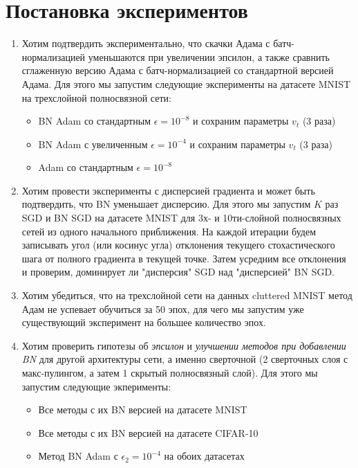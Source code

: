 \documentclass[12pt,oneside]{article}
\begin{document}
\section{Постановка экспериментов}

\begin{enumerate}
\item Хотим подтвердить экспериментально, что скачки Адама с батч-нормализацией уменьшаются при увеличении эпсилон, а также сравнить сглаженную версию Адама с батч-нормализацией со стандартной версией Адама. Для этого мы запустим следующие эксперименты на датасете MNIST на трехслойной полносвязной сети:
\begin{itemize}
\item BN Adam со стандартным $\epsilon = 10^{-8}$ и сохраним параметры $v_t$ (3 раза)
\item BN Adam с увеличенным $\epsilon = 10^{-4}$ и сохраним параметры $v_t$ (3 раза)
\item Adam со стандартным $\epsilon = 10^{-8}$
\end{itemize}

\item Хотим провести эксперименты с дисперсией градиента и может быть подтвердить, что BN уменьшает дисперсию. Для этого мы запустим $K$ раз SGD и BN SGD на датасете MNIST для 3х- и 10ти-слойной полносвязных сетей из одного начального приближения. На каждой итерации будем записывать угол (или косинус угла) отклонения текущего стохастического шага от полного градиента в текущей точке. Затем усредним все отклонения и проверим, доминирует ли "дисперсия" SGD над "дисперсией" BN SGD.

\item Хотим убедиться, что на трехслойной сети на данных cluttered MNIST метод Адам не успевает обучиться за 50 эпох, для чего мы запустим уже существующий эксперимент на большее количество эпох.

\item Хотим проверить гипотезы об \emph{эпсилон} и \emph{улучшении методов при добавлении BN} для другой архитектуры сети, а именно сверточной (2 сверточных слоя с макс-пулингом, а затем 1 скрытый полносвязный слой). Для этого мы запустим следующие экперименты:
\begin{itemize}
\item Все методы с их BN версией на датасете MNIST
\item Все методы с их BN версией на датасете CIFAR-10
\item Метод BN Adam с $\epsilon_2 = 10^{-4}$ на обоих датасетах
\end{itemize}

\end{enumerate}
\end{document}
